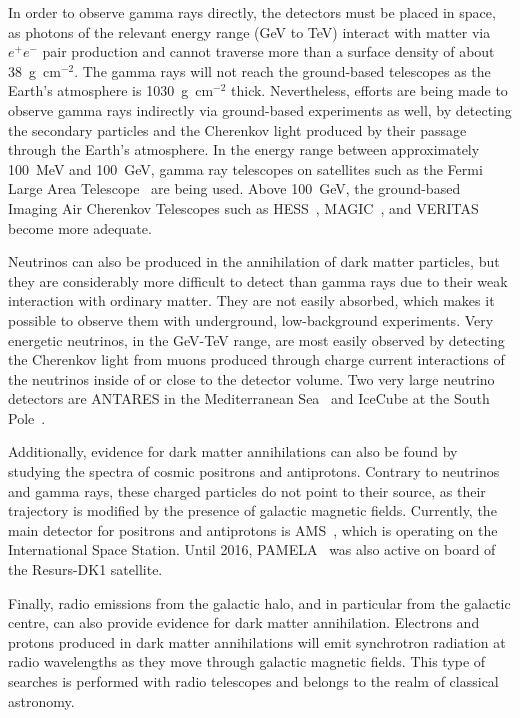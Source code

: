In order to observe gamma rays directly, the detectors must be placed in space, as photons of the relevant energy range (GeV to TeV) interact with matter via $e^+e^-$ pair production and cannot traverse more than a surface density of about 38~g~cm$^{-2}$. The gamma rays will not reach the ground-based telescopes as the Earth's atmosphere is 1030~g~cm$^{-2}$ thick. Nevertheless, efforts are being made to observe gamma rays indirectly via ground-based experiments as well, by detecting the secondary particles and the Cherenkov light produced by their passage through the Earth's atmosphere. In the energy range between approximately 100~MeV and 100~GeV, gamma ray telescopes on satellites such as the Fermi Large Area Telescope~\cite{Atwood:2009ez} are being used. Above 100~GeV, the ground-based Imaging Air Cherenkov Telescopes such as HESS~\cite{Aharonian:2006pe}, MAGIC~\cite{Aleksic:2011bx}, and VERITAS~\cite{Holder:2008ux} become more adequate.

Neutrinos can also be produced in the annihilation of dark matter particles, but they are considerably more difficult to detect than gamma rays due to their weak interaction with ordinary matter. They are not easily absorbed, which makes it possible to observe them with underground, low-background experiments. Very energetic neutrinos, in the GeV-TeV range, are most easily observed by detecting the Cherenkov light from muons produced through charge current interactions of the neutrinos inside of or close to the detector volume. Two very large neutrino detectors are ANTARES in the Mediterranean Sea~\cite{Collaboration:2011nsa} and IceCube at the South Pole~\cite{Achterberg:2006md}.

Additionally, evidence for dark matter annihilations can also be found by studying the spectra of cosmic positrons and antiprotons. Contrary to neutrinos and gamma rays, these charged particles do not point to their source, as their trajectory is modified by the presence of galactic magnetic fields. Currently, the main detector for positrons and antiprotons is AMS~\cite{Kounine:2012ega}, which is operating on the International Space Station. Until 2016, PAMELA~\cite{Picozza:2006nm} was also active on board of the Resurs-DK1 satellite.

Finally, radio emissions from the galactic halo, and in particular from the galactic centre, can also provide evidence for dark matter annihilation. Electrons and protons produced in dark matter annihilations will emit synchrotron radiation at radio wavelengths as they move through galactic magnetic fields. This type of searches is performed with radio telescopes and belongs to the realm of classical astronomy.

